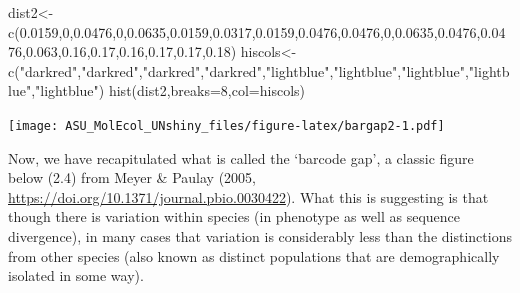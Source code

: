 \documentclass[
]{article}
\newenvironment{Shaded}{\begin{snugshade}}{\end{snugshade}}
\newcommand{\AttributeTok}[1]{\textcolor[rgb]{0.77,0.63,0.00}{#1}}
\newcommand{\DecValTok}[1]{\textcolor[rgb]{0.00,0.00,0.81}{#1}}
\newcommand{\FloatTok}[1]{\textcolor[rgb]{0.00,0.00,0.81}{#1}}
\newcommand{\FunctionTok}[1]{\textcolor[rgb]{0.00,0.00,0.00}{#1}}
\newcommand{\NormalTok}[1]{#1}
\newcommand{\OtherTok}[1]{\textcolor[rgb]{0.56,0.35,0.01}{#1}}
\newcommand{\StringTok}[1]{\textcolor[rgb]{0.31,0.60,0.02}{#1}}
\begin{document}
\begin{Shaded}
\begin{Highlighting}[]
\NormalTok{dist2}\OtherTok{\textless{}{-}}\FunctionTok{c}\NormalTok{(}\FloatTok{0.0159}\NormalTok{,}\DecValTok{0}\NormalTok{,}\FloatTok{0.0476}\NormalTok{,}\DecValTok{0}\NormalTok{,}\FloatTok{0.0635}\NormalTok{,}\FloatTok{0.0159}\NormalTok{,}\FloatTok{0.0317}\NormalTok{,}\FloatTok{0.0159}\NormalTok{,}\FloatTok{0.0476}\NormalTok{,}\FloatTok{0.0476}\NormalTok{,}\DecValTok{0}\NormalTok{,}\FloatTok{0.0635}\NormalTok{,}\FloatTok{0.0476}\NormalTok{,}\FloatTok{0.0476}\NormalTok{,}\FloatTok{0.063}\NormalTok{,}\FloatTok{0.16}\NormalTok{,}\FloatTok{0.17}\NormalTok{,}\FloatTok{0.16}\NormalTok{,}\FloatTok{0.17}\NormalTok{,}\FloatTok{0.17}\NormalTok{,}\FloatTok{0.18}\NormalTok{)}
\NormalTok{hiscols}\OtherTok{\textless{}{-}}\FunctionTok{c}\NormalTok{(}\StringTok{"darkred"}\NormalTok{,}\StringTok{"darkred"}\NormalTok{,}\StringTok{"darkred"}\NormalTok{,}\StringTok{"darkred"}\NormalTok{,}\StringTok{"lightblue"}\NormalTok{,}\StringTok{"lightblue"}\NormalTok{,}\StringTok{"lightblue"}\NormalTok{,}\StringTok{"lightblue"}\NormalTok{,}\StringTok{"lightblue"}\NormalTok{)}
\FunctionTok{hist}\NormalTok{(dist2,}\AttributeTok{breaks=}\DecValTok{8}\NormalTok{,}\AttributeTok{col=}\NormalTok{hiscols)}
\end{Highlighting}
\end{Shaded}

\texttt{[image: ASU\_MolEcol\_UNshiny\_files/figure-latex/bargap2-1.pdf]}

Now, we have recapitulated what is called the `barcode gap', a classic
figure below (2.4) from Meyer \& Paulay (2005,
\url{https://doi.org/10.1371/journal.pbio.0030422}). What this is
suggesting is that though there is variation within species (in
phenotype as well as sequence divergence), in many cases that variation
is considerably less than the distinctions from other species (also
known as distinct populations that are demographically isolated in some
way).
\end{document}
